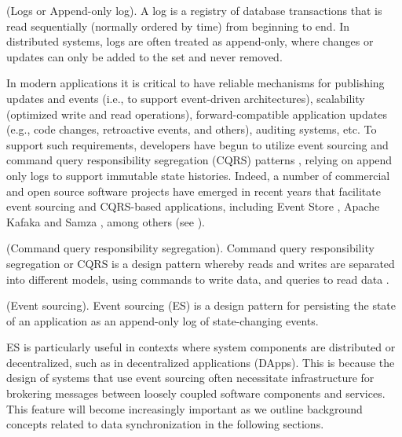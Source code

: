 \documentclass{textile}
\begin{document}
\begin{definition} (Logs or Append-only log). A log is a registry of database transactions that is read sequentially (normally ordered by time) from beginning to end. In distributed systems, logs are often treated as append-only, where changes or updates can only be added to the set and never removed.  \end{definition} \label{def:Logs}

In modern applications it is critical to have reliable mechanisms for publishing updates and events (i.e., to support event-driven architectures), scalability (optimized write and read operations), forward-compatible application updates (e.g., code changes, retroactive events, and others), auditing systems, etc. To support such requirements, developers have begun to utilize event sourcing and command query responsibility segregation (CQRS) patterns \cite{bettsExploringCQRSEvent2013}, relying on append only logs to support immutable state histories. Indeed, a number of commercial and open source software projects have emerged in recent years that facilitate event sourcing and CQRS-based applications, including Event Store \cite{EventStore}, Apache Kafaka \cite{ApacheKafka} and Samza \cite{ApacheSamza}, among others (see \cite{kleppmannDesigningDataintensiveApplications2017}). 

\begin{definition} (Command query responsibility segregation). Command query responsibility segregation or CQRS is a design pattern whereby reads and writes are separated into different models, using commands to write data, and queries to read data \cite{martinfowlerCQRS2011}. \end{definition}

\begin{definition} (Event sourcing). Event sourcing (ES) is a design pattern for persisting the state of an application as an append-only log of state-changing events. \end{definition}

ES is particularly useful in contexts where system components are distributed or decentralized, such as in decentralized applications (DApps). This is because the design of systems that use event sourcing often necessitate infrastructure for brokering messages between loosely coupled software components and services. This feature will become increasingly important as we outline background concepts related to data synchronization in the following sections. 
\end{document}

